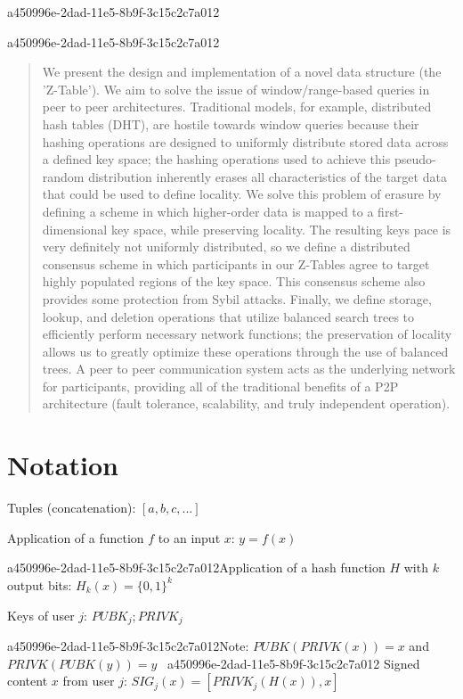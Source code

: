 \documentclass[12pt]{article}
\begin{document}
a450996e-2dad-11e5-8b9f-3c15c2c7a012\maketitle

a450996e-2dad-11e5-8b9f-3c15c2c7a012\begin{abstract}
We present the design and implementation of a novel data structure (the 'Z-Table'). We aim to solve the issue of window/range-based queries in peer to peer architectures. Traditional models, for example,  distributed hash tables (DHT), are hostile towards window queries because their hashing operations are designed to uniformly distribute stored data across a defined key space; the hashing operations used to achieve this pseudo-random distribution inherently erases all characteristics of the target data that could be used to define locality. We solve this problem of erasure by defining a scheme in which higher-order data is mapped to a first-dimensional key space, while preserving locality. The resulting keys pace is very definitely not uniformly distributed, so we define a distributed consensus scheme in which participants in our Z-Tables agree to target highly populated regions of the key space. This consensus scheme also provides some protection from Sybil attacks. Finally, we define storage, lookup, and deletion operations that utilize balanced search trees to efficiently perform necessary network functions; the preservation of locality allows us to greatly optimize these operations through the use of balanced trees. A peer to peer communication system acts as the underlying network for participants, providing all of the traditional benefits of a P2P architecture (fault tolerance, scalability, and truly independent operation).
\end{abstract}

\section{Notation}

Tuples (concatenation): $[a,b,c,...]$

Application of a function $f$ to an input $x$: $y=f(x)$

a450996e-2dad-11e5-8b9f-3c15c2c7a012Application of a hash function $H$ with $k$ output bits: $H_{k}(x) = \{0,1\}^k$

Keys of user $j$: $ PUBK_j; PRIVK_j $

a450996e-2dad-11e5-8b9f-3c15c2c7a012Note: $PUBK(PRIVK(x)) = x$ and $PRIVK(PUBK(y)) = y$~
a450996e-2dad-11e5-8b9f-3c15c2c7a012
Signed content $x$ from user $j$: $SIG_j(x) = \left[ PRIVK_j( H(x) ), x \right]$
\end{document}
